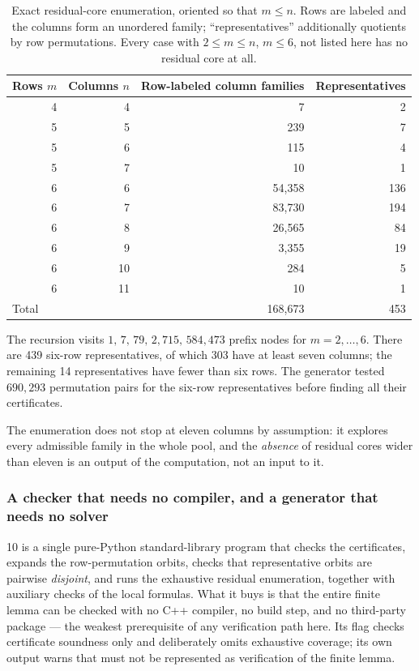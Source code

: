 \documentclass[11pt,letterpaper]{article}
\numberwithin{equation}{section}
\theoremstyle{definition}
\theoremstyle{remark}
\newcommand{\code}[1]{\texttt{\detokenize{#1}}}
\begin{document}
\begin{table}[htbp]
\centering
\caption{Exact residual-core enumeration, oriented so that $m\le n$. Rows are
labeled and the columns form an unordered family; ``representatives''
additionally quotients by row permutations. Every case with $2\le m\le n$,
$m\le6$, not listed here has no residual core at all.}
\label{tab:cores}
\begin{tabular}{rrrr}
\toprule
Rows $m$ & Columns $n$ & Row-labeled column families & Representatives\\
\midrule
4 & 4 & 7 & 2\\
5 & 5 & 239 & 7\\
5 & 6 & 115 & 4\\
5 & 7 & 10 & 1\\
6 & 6 & 54,358 & 136\\
6 & 7 & 83,730 & 194\\
6 & 8 & 26,565 & 84\\
6 & 9 & 3,355 & 19\\
6 & 10 & 284 & 5\\
6 & 11 & 10 & 1\\
\midrule
\multicolumn{2}{l}{Total} & 168,673 & 453\\
\bottomrule
\end{tabular}
\end{table}

The recursion visits $1,\,7,\,79,\,2{,}715,\,584{,}473$ prefix nodes for
$m=2,\ldots,6$. There are 439 six-row representatives, of which 303 have at
least seven columns; the remaining 14 representatives have fewer than six
rows. The generator tested $690{,}293$ permutation pairs for the six-row
representatives before finding all their certificates.

The enumeration does not stop at eleven columns by assumption: it explores
every admissible family in the whole pool, and the \emph{absence} of residual
cores wider than eleven is an output of the computation, not an input to it.

\subsubsection{A checker that needs no compiler, and a generator that needs no solver}
\begin{variantbox}{10}
\code{residual/verify.py} is a single pure-Python standard-library program
that checks the certificates, expands the row-permutation orbits, checks that
representative orbits are pairwise \emph{disjoint}, and runs the exhaustive
residual enumeration, together with auxiliary checks of the local formulas.
What it buys is that the entire finite lemma can be checked with no C++
compiler, no build step, and no third-party package --- the weakest
prerequisite of any verification path here. Its \code{--quick} flag checks
certificate soundness only and deliberately omits exhaustive coverage; its own
output warns that \code{--quick} must not be represented as verification of
the finite lemma.
\end{variantbox}
\end{document}

